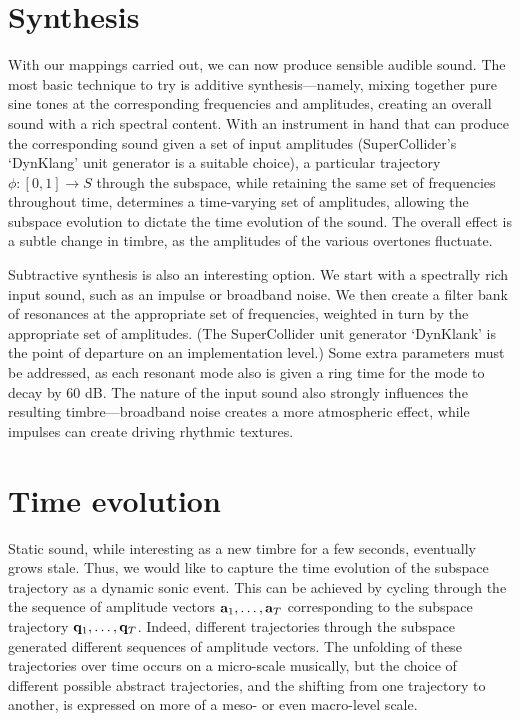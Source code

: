 \documentclass[11pt]{article}
\begin{document}
\section*{Synthesis}
With our mappings carried out, we can now produce sensible audible sound. The most basic technique to try is additive synthesis---namely, mixing together pure sine tones at the corresponding frequencies and amplitudes, creating an overall sound with a rich spectral content. With an instrument in hand that can produce the corresponding sound given a set of input amplitudes (SuperCollider's `DynKlang' unit generator is a suitable choice), a particular trajectory $\phi \colon [0, 1] \rightarrow S$ through the subspace, while retaining the same set of frequencies throughout time, determines a time-varying set of amplitudes, allowing the subspace evolution to dictate the time evolution of the sound. The overall effect is a subtle change in timbre, as the amplitudes of the various overtones fluctuate.

Subtractive synthesis is also an interesting option. We start with a spectrally rich input sound, such as an impulse or broadband noise. We then create a filter bank of resonances at the appropriate set of frequencies, weighted in turn by the appropriate set of amplitudes. (The SuperCollider unit generator `DynKlank' is the point of departure on an implementation level.) Some extra parameters must be addressed, as each resonant mode also is given a ring time for the mode to decay by $60$ dB. The nature of the input sound also strongly influences the resulting timbre---broadband noise creates a more atmospheric effect, while impulses can create driving rhythmic textures. 

\section*{Time evolution}
Static sound, while interesting as a new timbre for a few seconds, eventually grows stale. Thus, we would like to capture the time evolution of the subspace trajectory as a dynamic sonic event. This can be achieved by cycling through the the sequence of amplitude vectors $\mathbf{a}_1, \ldots, \mathbf{a}_T$ corresponding to the subspace trajectory $\mathbf{q}_1, \ldots, \mathbf{q}_T$. Indeed, different trajectories through the subspace generated different sequences of amplitude vectors. The unfolding of these trajectories over time occurs on a micro-scale musically, but the choice of different possible abstract trajectories, and the shifting from one trajectory to another, is expressed on more of a meso- or even macro-level scale.
\end{document}
